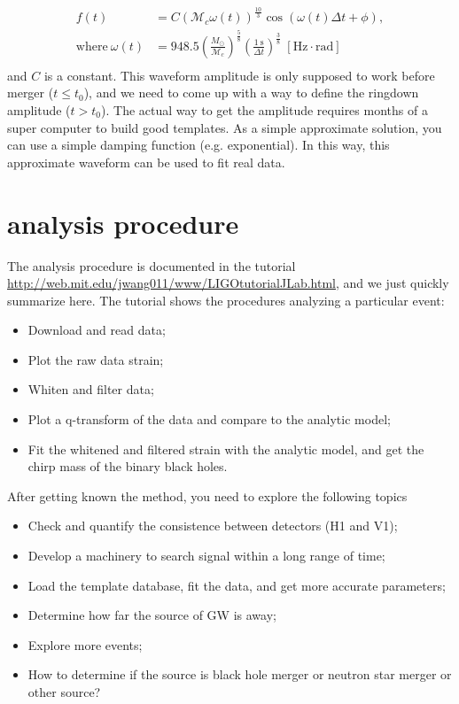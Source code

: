 \documentclass[twoside,twocolumn]{article}
\begin{document}
\begin{equation}\label{eq:fwt}
  \begin{split}
    f(t) &= C\left(\mathcal{M}_{c}\omega(t)\right)^{\frac{10}{3}}\cos(\omega(t)\Delta t +\phi), \\
    \mathrm{where}\:\omega(t) &= 948.5\left(\frac{M_{\odot}}{\mathcal{M}_{c}}\right)^{\frac{5}{8}}\left(\frac{1\:\mathrm{s}}{\Delta t}\right)^{\frac{3}{8}}\;\mathrm{[Hz\cdot rad]} \\
  \end{split}
\end{equation}
and $C$ is a constant. This waveform amplitude is only supposed to work before merger ($t \leq t_{0}$), and we need to come up with a way to define the ringdown amplitude ($t > t_{0}$). The actual way to get the amplitude requires months of a super computer to build good templates. As a simple approximate solution, you can use a simple damping function (e.g. exponential). In this way, this approximate waveform can be used to fit real data.


\section[Analysis procedure]{analysis procedure}\label{sec:analysis}
The analysis procedure is documented in the tutorial \url{http://web.mit.edu/jwang011/www/LIGOtutorialJLab.html}, and we just quickly summarize here. The tutorial shows the procedures analyzing a particular event:
\begin{itemize}
\item Download and read data;
\item Plot the raw data strain;
\item Whiten and filter data;
\item Plot a q-transform of the data and compare to the analytic model;
\item Fit the whitened and filtered strain with the analytic model, and get the chirp mass of the binary black holes.
\end{itemize}
After getting known the method, you need to explore the following topics
\begin{itemize}
\item Check and quantify the consistence between detectors (H1 and V1);
\item Develop a machinery to search signal within a long range of time;
\item Load the template database, fit the data, and get more accurate parameters;
\item Determine how far the source of GW is away;
\item Explore more events;
\item How to determine if the source is black hole merger or neutron star merger or other source?
\end{itemize}
\end{document}
